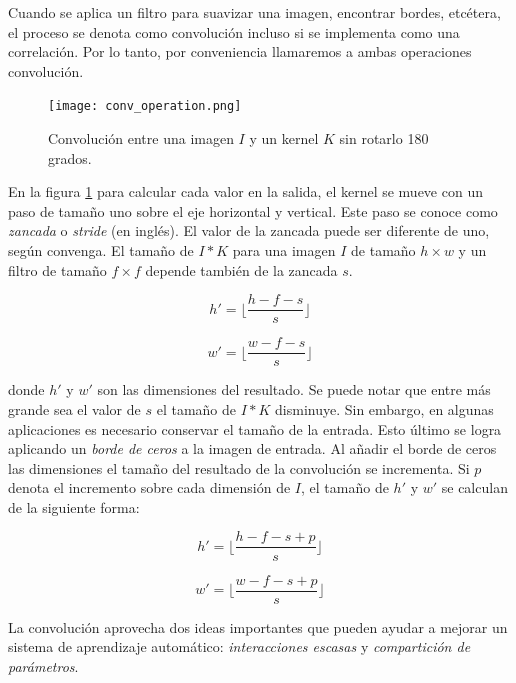 Cuando se aplica un filtro para suavizar una imagen, encontrar bordes, etcétera, el 
proceso se denota como convolución incluso si se implementa como una correlación. Por
lo tanto, por conveniencia llamaremos a ambas operaciones convolución.

\begin{figure}[h]
    \centering
    \texttt{[image: conv\_operation.png]}
    \caption{Convolución entre una imagen
    $I$ y un kernel $K$ sin rotarlo 180 grados.}
    \label{fig:convolution_example}
\end{figure}

En la figura \ref{fig:convolution_example} para calcular
cada valor en la salida, el kernel se mueve con un paso 
de tamaño uno sobre el eje horizontal y vertical. Este paso
se conoce como \textit{zancada} o \textit{stride} (en inglés).
El valor de la zancada puede ser diferente de uno, según 
convenga. El tamaño de $I * K$ para una imagen $I$ de tamaño
$h \times w$ y un filtro de tamaño $f \times f$ depende también de
la zancada $s$.

\[
h' = \lfloor\frac{h-f-s}{s}\rfloor
\]

\[
w' = \lfloor\frac{w-f-s}{s}\rfloor
\]

donde $h'$ y $w'$ son las dimensiones del resultado.
Se puede notar que entre más grande sea el valor de $s$
el tamaño de $I * K$ disminuye. Sin embargo, en algunas 
aplicaciones es necesario conservar el tamaño de la entrada.
Esto último se logra aplicando un \textit{borde de ceros}
a la imagen de entrada. Al añadir el borde de ceros las
dimensiones el tamaño del resultado de la convolución se 
incrementa. Si $p$ denota el incremento sobre cada dimensión
de $I$, el tamaño de $h'$ y $w'$ se calculan de la siguiente 
forma:


\[
h' = \lfloor\frac{h-f-s+p}{s}\rfloor
\]

\[
w' = \lfloor\frac{w-f-s+p}{s}\rfloor
\]


La convolución aprovecha dos ideas importantes que pueden ayudar a mejorar un
sistema de aprendizaje automático: \textit{interacciones escasas} y \textit{compartición de parámetros}.

